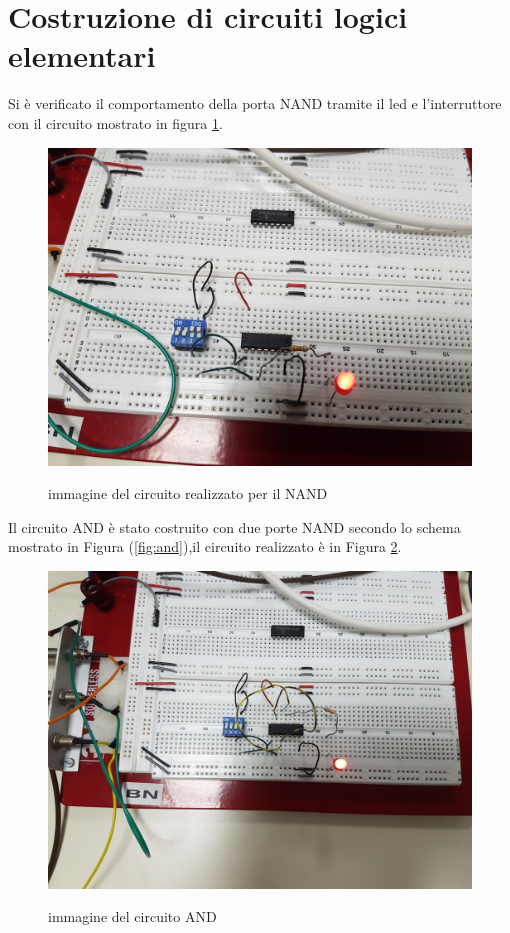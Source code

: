 \documentclass[10pt,a4paper]{article}
\begin{document}
\section{Costruzione di circuiti logici elementari}
Si è verificato il comportamento della porta NAND tramite il led e l'interruttore con il circuito mostrato in figura \ref{NAND}.\\
\begin{figure}[h]\centering

\includegraphics[scale=0.04]{20190221_164815.jpg}\label{NAND}
\caption{immagine del circuito realizzato per il NAND }
\end{figure}
Il circuito AND è stato costruito con due porte NAND secondo lo schema mostrato in Figura (\ref{fig:and}),il circuito realizzato è in Figura \ref{AND}.
\begin{figure}[h]\centering
	
	\includegraphics[scale=0.04]{20190221_165301.jpg}\label{AND}
	\caption{immagine del circuito AND }
\end{figure}\\
\end{document}
